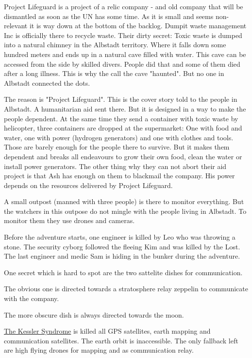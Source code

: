 Project Lifeguard is a project of a relic company - and old company that will be dismantled as soon as the UN has some time. As it is small and seems non-relevant it is way down at the bottom of the backlog.
Dumpit waste management Inc is officially there to recycle waste. Their dirty secret: Toxic waste is dumped into a natural chimney in the Albstadt territory. Where it falls down some hundred meters and ends up in a natural cave filled with water. This cave can be accessed from the side by skilled divers. People did that and some of them died after a long illness. This is why the call the cave "haunted". But no one in Albstadt connected the dots.

The reason is "Project Lifeguard". This is the cover story told to the people in Albstadt. A humanitarian aid sent there. But it is designed in a way to make the people dependent. At the same time they send a container with toxic waste by helicopter, three containers are dropped at the supermarket: One with food and water, one with power (hydrogen generators) and one with clothes and tools.
Those are barely enough for the people there to survive. But it makes them dependent and breaks all endeavours to grow their own food, clean the water or install power generators.
The other thing why they can not abort their aid project is that Ash has enough on them to blackmail the company. His power depends on the resources delivered by Project Lifeguard.

A small outpost (manned with three people) is there to monitor everything. But the watchers in this outpose do not mingle with the people living in Albstadt. To monitor them they use drones and cameras.

Before the adventure starts, one engineer is killed by Leo who was throwing a stone. The security cyborg followed the fleeing Kim and was killed by the Lost.
The last engineer and medic Sam is hiding in the bunker during the adventure.

One secret which is hard to spot are the two sattelite dishes for communication.

The obvious one is directed towards a stratosphere relay zeppelin to communicate with the company.

The more obscure dish is always directed towards the moon.

\begin{sidebarBox}[title=Kessler Syndrome]

    \hyperref[sec: sec: Kessler Syndrome]{The Kessler Syndrome} is killed all GPS satellites, earth mapping and communication satellites. The earth orbit is inaccessible. The only fallback left are high flying drones for mapping and as communication relay.
\end{sidebarBox}


